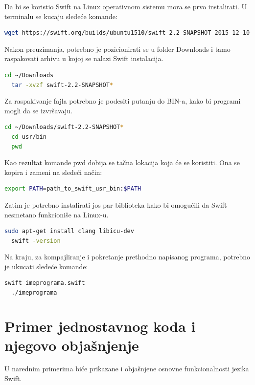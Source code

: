 \documentclass[a4paper]{article}
\begin{document}
Da bi se koristio Swift na Linux operativnom sistemu mora se prvo instalirati. U terminalu se kucaju sledeće komande:

\begin{lstlisting}[language=bash, caption={Instaliranje Swift-a}]
	wget https://swift.org/builds/ubuntu1510/swift-2.2-SNAPSHOT-2015-12-10-a/swift-2.2-SNAPSHOT-2015-12-10-a-ubuntu15.10.tar.gz
\end{lstlisting}

Nakon preuzimanja, potrebno je pozicionirati se u folder Downloads i tamo raspakovati arhivu u kojoj se nalazi Swift instalacija.

\begin{lstlisting}[language=bash, caption={Raspakovanje Swift instalacije}]
  cd ~/Downloads
  tar -xvzf swift-2.2-SNAPSHOT*
\end{lstlisting}

Za raspakivanje fajla potrebno je podesiti putanju do BIN-a, kako bi programi mogli da se izvršavaju.

\begin{lstlisting}[language=bash, caption={Podešavanje putanje do BIN-a}]
  cd ~/Downloads/swift-2.2-SNAPSHOT*
  cd usr/bin
  pwd
\end{lstlisting}

Kao rezultat komande pwd dobija se tačna lokacija koja će se koristiti. Ona se kopira i zameni na sledeći način:
\begin{lstlisting}[language=bash, caption={Kopiranje putanje}]
  export PATH=path_to_swift_usr_bin:$PATH
\end{lstlisting}

Zatim je potrebno instalirati jos par biblioteka kako bi omogućili da Swift nesmetano funkcioniše na Linux-u.

\begin{lstlisting}[language=bash, caption={Instalacija biblioteka}]
  sudo apt-get install clang libicu-dev
  swift -version
\end{lstlisting}

Na kraju, za kompajliranje i pokretanje prethodno napisanog programa, potrebno je ukucati sledeće komande:

\begin{lstlisting}[language=bash, caption={Komanda za kompajliranje}]
  swift imeprograma.swift
  ./imeprograma
\end{lstlisting}
 
\newpage 
 
\section{Primer jednostavnog koda i njegovo objašnjenje}	
\label{sec:sedmiDeo}
U narednim primerima biće prikazane i objašnjene osnovne funkcionalnosti jezika Swift.
\end{document}

